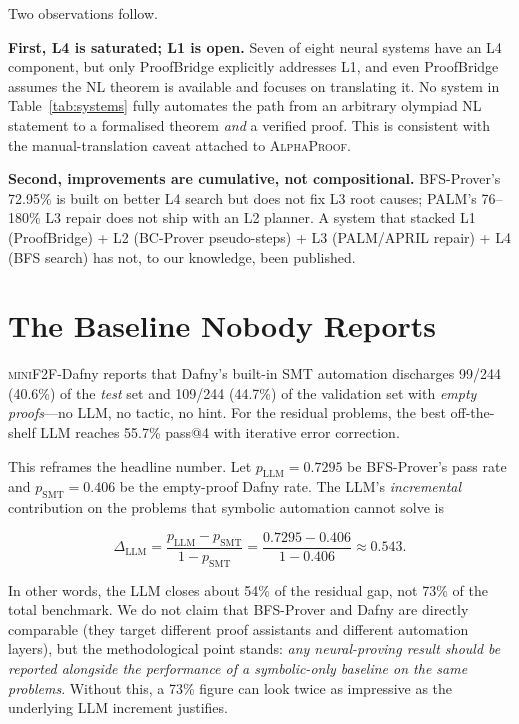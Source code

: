 \documentclass[11pt,letterpaper]{article}
\begin{document}
Two observations follow.

\textbf{First, L4 is saturated; L1 is open.} Seven of eight neural
systems have an L4 component, but only ProofBridge explicitly
addresses L1, and even ProofBridge assumes the NL theorem is available
and focuses on translating it. No system in Table~\ref{tab:systems}
fully automates the path from an arbitrary olympiad NL statement to a
formalised theorem \emph{and} a verified proof. This is consistent
with the manual-translation caveat attached to \textsc{AlphaProof}.

\textbf{Second, improvements are cumulative, not compositional.}
BFS-Prover's 72.95\% is built on better L4 search but does not fix L3
root causes; PALM's 76--180\% L3 repair does not ship with an L2
planner. A system that stacked L1 (ProofBridge) + L2 (BC-Prover
pseudo-steps) + L3 (PALM/APRIL repair) + L4 (BFS search) has not, to
our knowledge, been published.

\section{The Baseline Nobody Reports}
\label{sec:baseline}

\textsc{miniF2F}-Dafny \cite{baksys2025mini2f2dafny} reports that
Dafny's built-in SMT automation discharges 99/244 (40.6\%) of the
\emph{test} set and 109/244 (44.7\%) of the validation set with
\emph{empty proofs}---no LLM, no tactic, no hint. For the residual
problems, the best off-the-shelf LLM reaches 55.7\% pass@4 with
iterative error correction.

This reframes the headline number. Let $p_{\mathrm{LLM}}=0.7295$ be
BFS-Prover's pass rate and $p_{\mathrm{SMT}}=0.406$ be the empty-proof
Dafny rate. The LLM's \emph{incremental} contribution on the problems
that symbolic automation cannot solve is

\begin{equation}
  \Delta_{\mathrm{LLM}}
  = \frac{p_{\mathrm{LLM}} - p_{\mathrm{SMT}}}
         {1 - p_{\mathrm{SMT}}}
  = \frac{0.7295 - 0.406}{1 - 0.406}
  \approx 0.543.
  \label{eq:delta}
\end{equation}

In other words, the LLM closes about 54\% of the residual gap, not
73\% of the total benchmark. We do not claim that BFS-Prover and Dafny
are directly comparable (they target different proof assistants and
different automation layers), but the methodological point stands:
\emph{any neural-proving result should be reported alongside the
performance of a symbolic-only baseline on the same problems}.
Without this, a 73\% figure can look twice as impressive as the
underlying LLM increment justifies.
\end{document}
